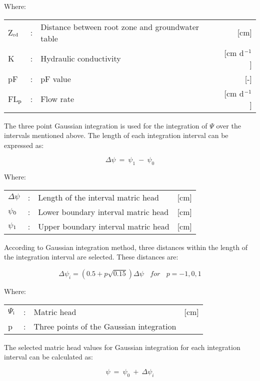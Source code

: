 Where:\\[5pt]
\begin{tabularx}{\textwidth}{llXr}
Z$_{{\rm rd}}$ &:& Distance between root zone and groundwater table  & [cm]\\
K &:& Hydraulic conductivity  & [cm d$^{{\rm -1}}$]\\
pF &:& pF value  & [-]\\
FL$_{{\rm p}}$ &:& Flow rate  & [cm d$^{{\rm -1}}$]\\
\end{tabularx}

The three point Gaussian integration is used for the integration of $\Psi$ over the intervals
mentioned above. The length of each integration interval can be expressed as:

\begin{equation}
\Delta \psi ~=~ \psi _{1} ~-~ \psi _{0} 
\end{equation}

Where:\\[5pt]
\begin{tabularx}{\textwidth}{llXr}
$\Delta$$\psi$ &:& Length of the interval matric head  & [cm]\\
$\psi$$_{{\rm 0}}$ &:& Lower boundary interval matric head  & [cm]\\
$\psi$$_{{\rm 1}}$ &:& Upper boundary interval matric head  & [cm]\\
\end{tabularx}

According to Gaussian integration method, three distances within the length of the
integration interval are selected. These distances are:

\begin{equation}
\Delta \psi_{i} = (0.5 + p \sqrt{0.15}) \Delta \psi ~~~~ for ~~~~ p = -1, 0, 1 
\end{equation}

Where:\\[5pt]
\begin{tabularx}{\textwidth}{llXr}
$\Psi$$_{{\rm i}}$ &:& Matric head  & [cm]\\
p &:& Three points of the Gaussian integration\\
\end{tabularx}

The selected matric head values for Gaussian integration for each integration interval can
be calculated as:

\begin{equation}
\psi ~=~ \psi _{0} ~+~\Delta \psi _{i} 
\end{equation}

